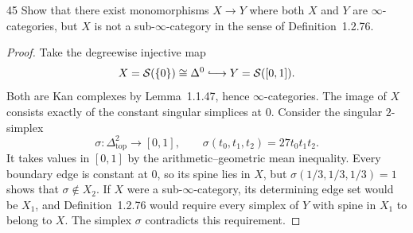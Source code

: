 \begin{exercise}{45}
Show that there exist monomorphisms $X\to Y$ where both $X$ and $Y$ are $\infty$-categories,
but $X$ is not a sub-$\infty$-category in the sense of Definition~1.2.76.

\begin{proof}
Take the degreewise injective map
\[
 X=\mathcal S(\{0\})\cong\Delta^0
 \lhook\joinrel\longrightarrow Y=\mathcal S([0,1]).
\]
Both are Kan complexes by Lemma~1.1.47, hence
$\infty$-categories. The image of $X$ consists exactly of
the constant singular simplices at $0$.
Consider the singular $2$-simplex
\[
 \sigma\colon\Delta^2_{\mathrm{top}}\longrightarrow[0,1],
 \qquad \sigma(t_0,t_1,t_2)=27t_0t_1t_2.
\]
It takes values in $[0,1]$ by the arithmetic--geometric
mean inequality. Every boundary edge is constant at $0$,
so its spine lies in $X$, but
$\sigma(1/3,1/3,1/3)=1$ shows that $\sigma\notin X_2$.
If $X$ were a sub-$\infty$-category, its determining edge set
would be $X_1$, and Definition~1.2.76 would require every
simplex of $Y$ with spine in $X_1$ to belong to $X$.
The simplex $\sigma$ contradicts this requirement.
\end{proof}
\end{exercise}
